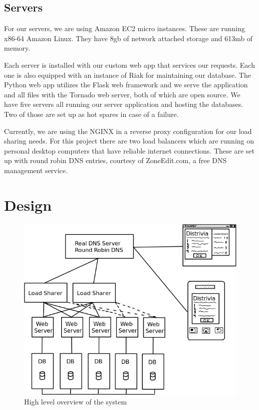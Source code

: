 \documentclass{dependencies/acm_proc_article-sp}
\begin{document}
\subsection{Servers}
For our servers, we are using Amazon EC2 micro instances.
These are running x86-64 Amazon Linux.
They have 8gb of network attached storage and 613mb of memory.

Each server is installed with our custom web app that services our requests.
Each one is also equipped with an instance of Riak for maintaining our database.
The Python web app utilizes the Flask web framework and we serve the application and all files with the Tornado web server, both of which are open source.
We have five servers all running our server application and hosting the databases.
Two of those are set up as hot spares in case of a failure.

Currently, we are using the NGINX \cite{nginx} in a reverse proxy configuration for our load sharing needs.
For this project there are two load balancers which are running on personal desktop computers that have reliable internet connections.
These are set up with round robin DNS entries, courtesy of ZoneEdit.com, a free DNS management service.

\section{Design}
\begin{figure}[h!]
  \centering
    \includegraphics[scale=0.4]{diagram.png}
   \caption{High level overview of the system}
 \end{figure}
\end{document}

